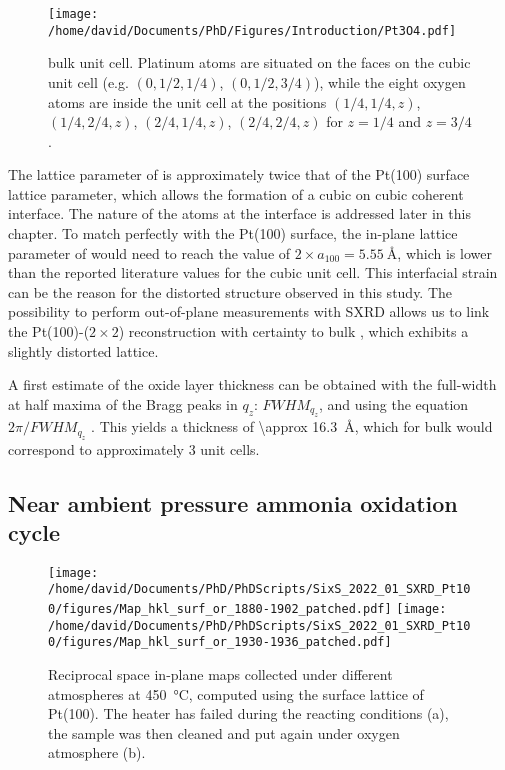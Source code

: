 \begin{SCfigure}
    \centering
    \texttt{[image: /home/david/Documents/PhD/Figures/Introduction/Pt3O4.pdf]}
    \caption{
         bulk unit cell.
        Platinum atoms are situated on the faces on the cubic unit cell (e.g. $(0, 1/2, 1/4)$, $(0, 1/2, 3/4)$), while the eight oxygen atoms are inside the unit cell at the positions $(1/4, 1/4, z)$, $(1/4, 2/4, z)$, $(2/4, 1/4, z)$, $(2/4, 2/4, z)$ for $z=1/4$ and $z=3/4$.
    }
    \label{fig:Pt3O4}
\end{SCfigure}

The lattice parameter of  is approximately twice that of the Pt(100) surface lattice parameter, which allows the formation of a cubic on cubic coherent interface.
The nature of the atoms at the interface is addressed later in this chapter.
To match perfectly with the Pt(100) surface, the in-plane lattice parameter of  would need to reach the value of $2\times a_{100} =\qty{5.55}{\angstrom}$, which is lower than the reported literature values for the cubic unit cell.
This interfacial strain can be the reason for the distorted structure observed in this study.
The possibility to perform out-of-plane measurements with SXRD allows us to link the Pt(100)-($2\times2$) reconstruction with certainty to bulk , which exhibits a slightly distorted lattice.

A first estimate of the oxide layer thickness can be obtained with the full-width at half maxima of the Bragg peaks in $q_z$: $FWHM_{q_z}$, and using the equation $2\pi/FWHM_{q_z}$ \parencite{Patterson1939, Warren1990}.
This yields a thickness of \qty{\approx 16.3}{\angstrom}, which for bulk  would correspond to approximately \num{3} unit cells.

\subsection{Near ambient pressure ammonia oxidation cycle}

\begin{figure}[!htb]
    \centering
    \texttt{[image: /home/david/Documents/PhD/PhDScripts/SixS\_2022\_01\_SXRD\_Pt100/figures/Map\_hkl\_surf\_or\_1880-1902\_patched.pdf]}
    \texttt{[image: /home/david/Documents/PhD/PhDScripts/SixS\_2022\_01\_SXRD\_Pt100/figures/Map\_hkl\_surf\_or\_1930-1936\_patched.pdf]}
    \caption{
        Reciprocal space in-plane maps collected under different atmospheres at \qty{450}{\degreeCelsius}, computed using the surface lattice of Pt(100).
        The heater has failed during the reacting conditions (a), the sample was then cleaned and put again under oxygen atmosphere (b).
    }
    \label{fig:MapsPt100B}
\end{figure}

